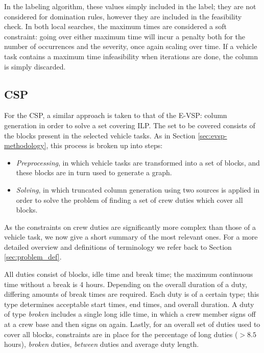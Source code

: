 \documentclass[]{article}
\begin{document}
In the labeling algorithm, these values simply included in the label; they are not considered for domination rules, however they are included in the feasibility check. In both local searches, the maximum times are considered a soft constraint: going over either maximum time will incur a penalty both for the number of occurrences and the severity, once again scaling over time. If a vehicle task contains a maximum time infeasibility when iterations are done, the column is simply discarded.

\subsection{CSP} \label{sec:csp-methodology}
For the CSP, a similar approach is taken to that of the E-VSP: column generation in order to solve a set covering ILP. The set to be covered consists of the blocks present in the selected vehicle tasks. As in Section \ref{sec:evsp-methodology}, this process is broken up into steps: 
\begin{itemize}
  \item \textit{Preprocessing}, in which vehicle tasks are transformed into a set of blocks, and these blocks are in turn used to generate a graph. 
  \item \textit{Solving}, in which truncated column generation using two sources is applied in order to solve the problem of finding a set of crew duties which cover all blocks. 
\end{itemize} 
As the constraints on crew duties are significantly more complex than those of a vehicle task, we now give a short summary of the most relevant ones. For a more detailed overview and definitions of terminology we refer back to Section \ref{sec:problem_def}.

All duties consist of blocks, idle time and break time; the maximum continuous time without a break is 4 hours. Depending on the overall duration of a duty, differing amounts of break times are required. Each duty is of a certain type; this type determines acceptable start times, end times, and overall duration. A duty of type \textit{broken} includes a single long idle time, in which a crew member signs off at a crew base and then signs on again. Lastly, for an overall set of duties used to cover all blocks, constraints are in place for the percentage of long duties ($>8.5$ hours), \textit{broken} duties, \textit{between} duties and average duty length.
\end{document}
